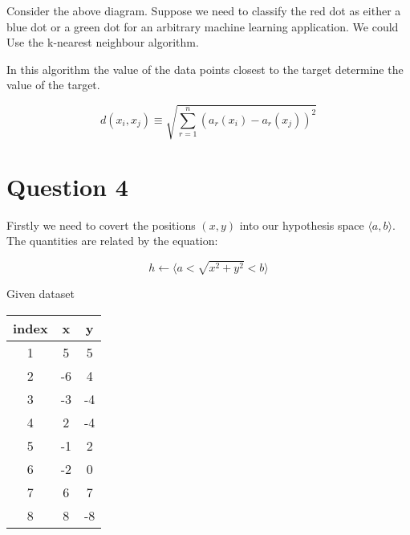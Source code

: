 \documentclass[10pt,a4paper]{article}
\begin{document}

Consider the above diagram. Suppose we need to classify the red dot as either a blue dot or a green dot for an arbitrary machine learning application. We could Use the k-nearest neighbour algorithm.

In this algorithm the value of the data points closest to the target determine the value of the target. 

\begin{equation}
d(x_i,x_j) \equiv \sqrt{\sum_{r=1}^n(a_r(x_i) - a_r(x_j))^2}
\end{equation}

\cite{Michell2009}
\cite{was}
\cite{Murphy}

\section{Question 4}

Firstly we need to covert the positions $(x,y)$ into our hypothesis space $\langle a,b \rangle$. The quantities are related by the equation: 

\begin{equation}
h \leftarrow \langle a < \sqrt{x^2 + y^2} < b \rangle
\end{equation}
 
Given dataset

\begin{tabular}{|c|c|c|}
\hline
index & x & y \\
\hline
1 & 5 & 5 \\
2 & -6 & 4 \\
3 & -3 & -4 \\
4 & 2  & -4 \\
5 & -1 & 2 \\
6 & -2 & 0 \\
7 & 6  & 7 \\
8 & 8  & -8 \\
\hline
\end{tabular} 
 
\end{document}
